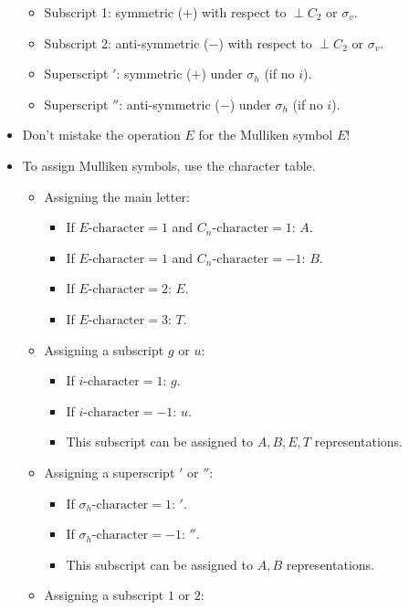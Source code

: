\documentclass[../notes.tex]{subfiles}
\begin{document}
\begin{itemize}
\begin{itemize}
        \item Subscript 1: symmetric ($+$) with respect to $\perp C_2$ or $\sigma_v$.
        \item Subscript 2: anti-symmetric ($-$) with respect to $\perp C_2$ or $\sigma_v$.
        \item Superscript $'$: symmetric ($+$) under $\sigma_h$ (if no $i$).
        \item Superscript $''$: anti-symmetric ($-$) under $\sigma_h$ (if no $i$).
    \end{itemize}
    \item Don't mistake the operation $E$ for the Mulliken symbol $E$!
    \item To assign Mulliken symbols, use the character table.
    \begin{itemize}
        \item Assigning the main letter:
        \begin{itemize}
            \item If $E\text{-character}=1$ and $C_n\text{-character}=1$: $A$.
            \item If $E\text{-character}=1$ and $C_n\text{-character}=-1$: $B$.
            \item If $E\text{-character}=2$: $E$.
            \item If $E\text{-character}=3$: $T$.
        \end{itemize}
        \item Assigning a subscript $g$ or $u$:
        \begin{itemize}
            \item If $i\text{-character}=1$: $g$.
            \item If $i\text{-character}=-1$: $u$.
            \item This subscript can be assigned to $A,B,E,T$ representations.
        \end{itemize}
        \item Assigning a superscript $'$ or $''$:
        \begin{itemize}
            \item If $\sigma_h\text{-character}=1$: $'$.
            \item If $\sigma_h\text{-character}=-1$: $''$.
            \item This subscript can be assigned to $A,B$ representations.
        \end{itemize}
        \item Assigning a subscript $1$ or $2$:
        \begin{itemize}

\end{itemize}
\end{itemize}
\end{itemize}
\end{document}
